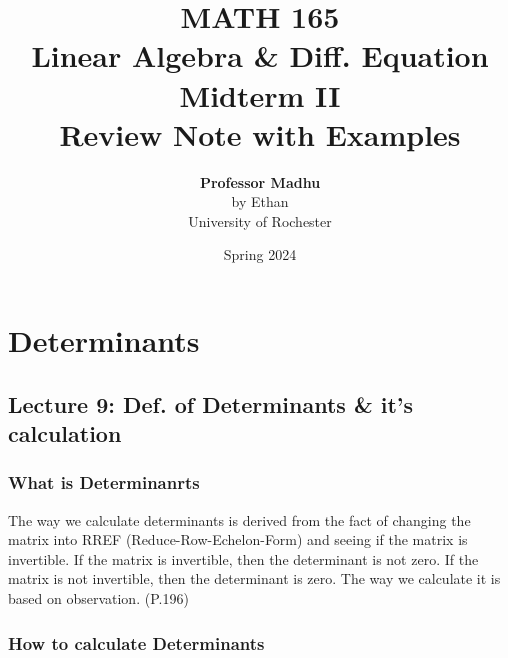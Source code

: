 \documentclass[oneside]{book}
\def\notetitle{MATH 165\\Linear Algebra \& Diff. Equation\\Midterm II \\Review Note with Examples}
\def\noteauthor{
    \textbf{Professor Madhu} \\ 
    by Ethan\\
    University of Rochester}
\def\notedate{Spring 2024}
\begin{document}
\title{\textbf{
    \LARGE{\notetitle} \vspace*{10\baselineskip}}
    }
\author{\noteauthor}
\date{\notedate}

\maketitle
\newpage

\tableofcontents
\newpage

\chapter{Determinants}
\section{Lecture 9: Def. of Determinants \& it's calculation}


\subsection{What is Determinanrts}

The way we calculate determinants is derived from the fact of changing the matrix into RREF (Reduce-Row-Echelon-Form) and seeing if the matrix is invertible. If the matrix is invertible, then the determinant is not zero. If the matrix is not invertible, then the determinant is zero. The way we calculate it is based on observation. (P.196)

\subsection{How to calculate Determinants}
\end{document}

